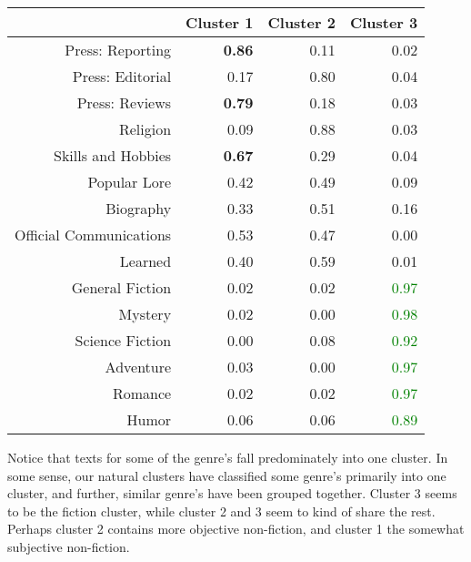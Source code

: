 \documentclass[11pt]{article}
\begin{document}
\begin{table}[ht]
\centering
\begin{tabular}{rrrr}
  \hline
 & Cluster 1 & Cluster 2 & Cluster 3 \\ 
  \hline
Press: Reporting & \bf{0.86} & 0.11 & 0.02 \\ 
  Press: Editorial & 0.17 & \textcolor{rose}{0.80} & 0.04 \\ 
  Press: Reviews & \bf{0.79} & 0.18 & 0.03 \\ 
  Religion & 0.09 & \textcolor{rose}{0.88} & 0.03 \\ 
  Skills and Hobbies & \bf{0.67} & 0.29 & 0.04 \\ 
  Popular Lore & 0.42 & 0.49 & 0.09 \\ 
  Biography & 0.33 & 0.51 & 0.16 \\ 
  Official Communications & 0.53 & 0.47 & 0.00 \\ 
  Learned & 0.40 & 0.59 & 0.01 \\ 
  General Fiction & 0.02 & 0.02 & \textcolor{green}{0.97} \\ 
  Mystery & 0.02 & 0.00 & \textcolor{green}{0.98} \\ 
  Science Fiction & 0.00 & 0.08 & \textcolor{green}{0.92} \\ 
  Adventure & 0.03 & 0.00 & \textcolor{green}{0.97} \\ 
  Romance & 0.02 & 0.02 & \textcolor{green}{0.97} \\ 
  Humor & 0.06 & 0.06 & \textcolor{green}{0.89} \\ 
   \hline
\end{tabular}
\end{table}

\noindent Notice that texts for some of the genre's fall predominately into one cluster.  In some sense, our natural clusters have classified some genre's primarily into one cluster, and further, similar genre's have been grouped together. Cluster 3 seems to be the fiction cluster, while cluster 2 and 3 seem to kind of share the rest. Perhaps cluster 2 contains more objective non-fiction, and cluster 1 the somewhat subjective non-fiction.
\end{document}
